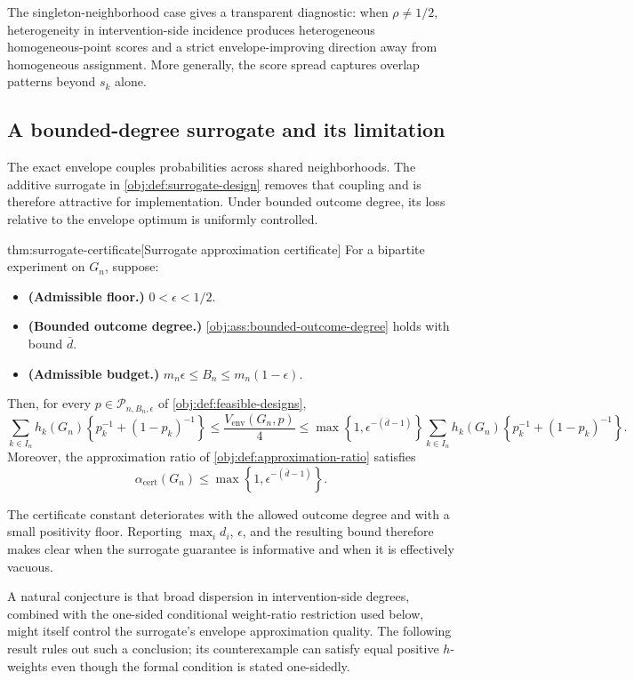 The singleton-neighborhood case gives a transparent diagnostic: when \(\rho\neq 1/2\), heterogeneity in intervention-side incidence produces heterogeneous homogeneous-point scores and a strict envelope-improving direction away from homogeneous assignment. More generally, the score spread captures overlap patterns beyond \(s_k\) alone.

\subsection{A bounded-degree surrogate and its limitation}

The exact envelope couples probabilities across shared neighborhoods. The additive surrogate in \cref{obj:def:surrogate-design} removes that coupling and is therefore attractive for implementation. Under bounded outcome degree, its loss relative to the envelope optimum is uniformly controlled.

\begin{theoremv}{thm:surrogate-certificate}[Surrogate approximation certificate]
For a bipartite experiment on \(G_n\), suppose:
\begin{itemize}
\item \textbf{(Admissible floor.)} \(0<\epsilon<1/2\).
\item \textbf{(Bounded outcome degree.)} \cref{obj:ass:bounded-outcome-degree} holds with bound \(\bar d\).
\item \textbf{(Admissible budget.)} \(m_n\epsilon\le B_n\le m_n(1-\epsilon)\).
\end{itemize}
Then, for every \(p\in\mathcal P_{n,B_n,\epsilon}\) of \cref{obj:def:feasible-designs},
\[
\sum_{k\in I_n}h_k(G_n)\!\left\{p_k^{-1}+(1-p_k)^{-1}\right\}
\le \frac{V_{\mathrm{env}}(G_n,p)}{4}
\le
\max\!\left\{1,\epsilon^{-(\bar d-1)}\right\}
\sum_{k\in I_n}h_k(G_n)\!\left\{p_k^{-1}+(1-p_k)^{-1}\right\}.
\]
Moreover, the approximation ratio of \cref{obj:def:approximation-ratio} satisfies
\[
\alpha_{\mathrm{cert}}(G_n)\le
\max\!\left\{1,\epsilon^{-(\bar d-1)}\right\}.
\]
\end{theoremv}

The certificate constant deteriorates with the allowed outcome degree and with a small positivity floor. Reporting \(\max_i d_i\), \(\epsilon\), and the resulting bound therefore makes clear when the surrogate guarantee is informative and when it is effectively vacuous.

A natural conjecture is that broad dispersion in intervention-side degrees, combined with the one-sided conditional weight-ratio restriction used below, might itself control the surrogate's envelope approximation quality. The following result rules out such a conclusion; its counterexample can satisfy equal positive \(h\)-weights even though the formal condition is stated one-sidedly.

